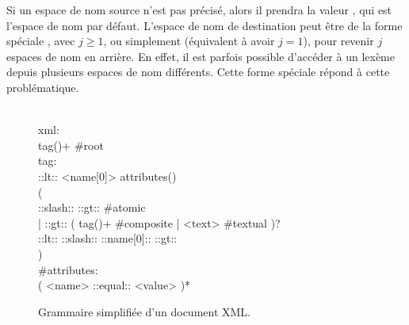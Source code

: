 Si un espace de nom source n'est pas précisé, alors il prendra la valeur
, qui est l'espace de nom par défaut. L'espace de nom de
destination peut être de la forme spéciale , avec $j
\geq 1$, ou simplement  (équivalent à avoir $j = 1$), pour
revenir $j$ espaces de nom en arrière. En effet, il est parfois possible
d'accéder à un lexème depuis plusieurs espaces de nom différents. Cette forme
spéciale répond à cette problématique. \\

\begin{figure}

\begin{bigpre}
\\
xml: \\
    tag()+ #root \\
tag: \\
    ::lt:: <name[0]> attributes() \\
    ( \\
      ::slash:: ::gt:: #atomic \\
    | ::gt:: ( tag()+ #composite | <text> #textual )? \\
      ::lt:: ::slash:: ::name[0]:: ::gt:: \\
    ) \\
#attributes: \\
    ( <name> ::equal:: <value> )*
\end{bigpre}

\caption{\label{figure:data:xml} Grammaire simplifiée d'un document XML.}

\end{figure}

